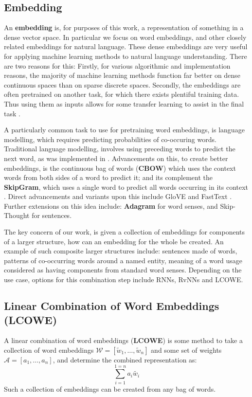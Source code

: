 \documentclass{book}
\begin{document}
\subsection{Embedding}
An \textbf{embedding} is, for purposes of this work,
a representation of something in a dense vector space.
In particular we focus on word embeddings, and other closely related embeddings for natural language.
These dense embeddings are very useful for applying machine learning methods to natural language understanding.
There are two reasons for this:
Firstly, for various algorithmic and implementation reasons, the majority of machine learning methods
function far better on dense continuous spaces than on sparse discrete spaces.
Secondly, the embeddings are often pretrained on another task, for which there exists plentiful training data.
Thus using them as inputs allows for some transfer learning to assist in the final task \citep{NPLM,collobert2008unified}.

A particularly common task to use for pretraining word embeddings,
is language modelling, which requires predicting probabilities of co-occuring words.
Traditional language modelling, involves using preceding words to predict the next word, as was implemented in \citet{NPLM}.
Advancements on this, to create better embeddings,
is the continuous bag of words (\textbf{CBOW}) which uses the context words from both sides of a word to predict it;
and its complement the \textbf{SkipGram}, which uses a single word to predict all words occurring in its context \citep{mikolov2013efficient,mikolov2013linguisticsubstructures}.
Direct advancements and variants upon this include GloVE \citep{pennington2014glove} and FastText \citep{bojanowski2016enriching}.
Further extensions on this idea include: \textbf{Adagram}\citep{AdaGrams} for word senses,
and Skip-Thought \citep{DBLP:journals/corr/KirosZSZTUF15} for sentences.


The key concern of our work, is given a collection of embeddings for components of a larger structure,
how can an embedding for the whole be created.
An example of such composite larger structures include:
sentences made of words,
patterns of co-occurring words around a named entity,
meaning of a word usage considered as having components from standard word senses.
Depending on the use case, options for this combination step include RNNs, RvNNs and LCOWE.

\subsection{Linear Combination of Word Embeddings (LCOWE)}
A linear combination of word embeddings (\textbf{LCOWE}) is some method 
to take a collection of word embeddings $\mathcal{W}= [ \tilde{w}_1,\ldots,\tilde{w}_n ]$
and some set of weights $\mathcal{A}= [ a_1, \ldots, a_n ]$,
and determine the combined representation as:
\begin{equation}
\sum_{i=1}^{1=n} a_i \tilde{w_i}
\end{equation}
Such a collection of embeddings can be created from  any bag of words.
\end{document}
